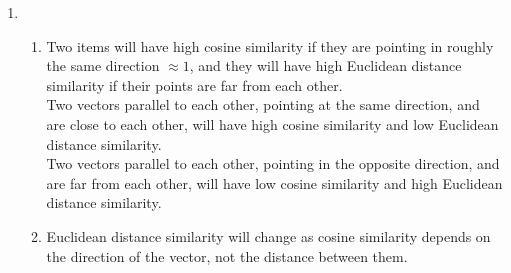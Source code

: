\documentclass{article}
\begin{document}
    \begin{enumerate}
        \item \begin{enumerate}[label=(\alph*)]
            \item Two items will have high cosine similarity if they are pointing in roughly the same direction $\approx 1$, and they will have high Euclidean distance similarity if their points are far from each other.\\[0.25in]
            Two vectors parallel to each other, pointing at the same direction, and are close to each other, will have high cosine similarity and low Euclidean distance similarity.\\[0.25in]
            Two vectors parallel to each other, pointing in the opposite direction, and are far from each other, will have low cosine similarity and high Euclidean distance similarity.
            \item Euclidean distance similarity will change as cosine similarity depends on the direction of the vector, not the distance between them.
        \end{enumerate}
    \end{enumerate}
\end{document}
